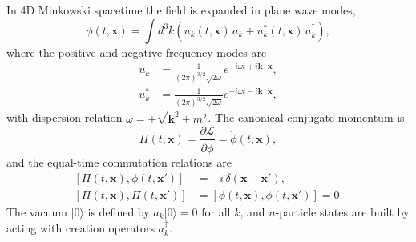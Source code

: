 In 4D Minkowski spacetime the field is expanded in plane wave modes,
\begin{equation}
	\phi(t,\mathbf{x}) = \int d^3k
	\left(u_k(t,\mathbf{x})\,a_k
	+ u_k^*(t,\mathbf{x})\,a_k^\dagger\right),
\end{equation}
where the positive and negative frequency modes are
\begin{align}
	u_k   & = \frac{1}{(2\pi)^{3/2}\sqrt{2\omega}}
	e^{-i\omega t + i\mathbf{k}\cdot\mathbf{x}},   \\
	u_k^* & = \frac{1}{(2\pi)^{3/2}\sqrt{2\omega}}
	e^{+i\omega t - i\mathbf{k}\cdot\mathbf{x}},
\end{align}
with dispersion relation $\omega = +\sqrt{\mathbf{k}^2+m^2}$. The
canonical conjugate momentum is
\begin{equation}
	\Pi(t,\mathbf{x})
	= \frac{\partial\mathcal{L}}{\partial\dot\phi}
	= \dot\phi(t,\mathbf{x}),
\end{equation}
and the equal-time commutation relations are
\begin{align}
	\left[\Pi(t,\mathbf{x}),\phi(t,\mathbf{x}')\right]
	 & = -i\,\delta(\mathbf{x}-\mathbf{x}'),                      \\
	\left[\Pi(t,\mathbf{x}),\Pi(t,\mathbf{x}')\right]
	 & = \left[\phi(t,\mathbf{x}),\phi(t,\mathbf{x}')\right] = 0.
\end{align}
The vacuum $|0\rangle$ is defined by $a_k|0\rangle = 0$ for all $k$,
and $n$-particle states are built by acting with creation operators
$a_k^\dagger$.

